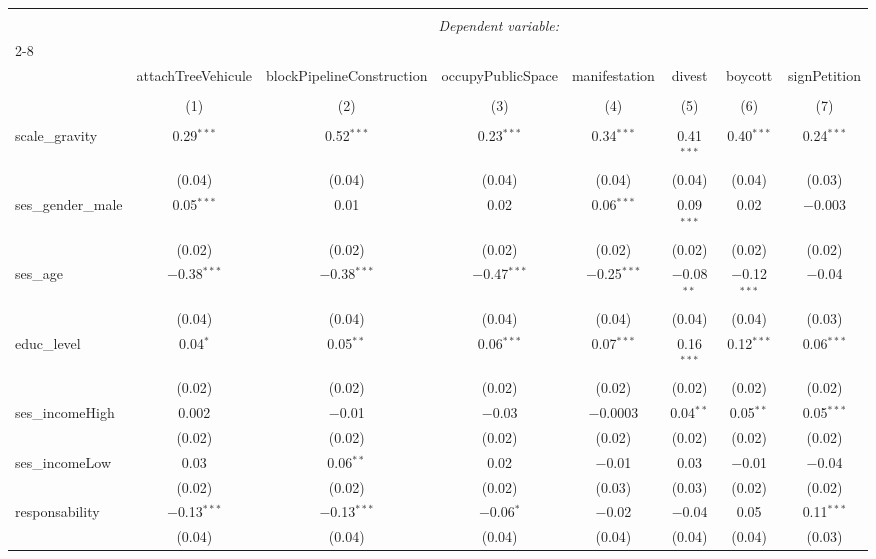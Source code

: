 \documentclass[
]{article}
\begin{document}
\begin{sidewaystable}[!htbp] \centering 
  \caption{Sans interaction 2} 
  \label{} 
\begin{tabular}{@{\extracolsep{1pt}}lccccccc} 
\\[-1.8ex]\hline 
\hline \\[-1.8ex] 
 & \multicolumn{7}{c}{\textit{Dependent variable:}} \\ 
\cline{2-8} 
\\[-1.8ex] & attachTreeVehicule & blockPipelineConstruction & occupyPublicSpace & manifestation & divest & boycott & signPetition \\ 
\\[-1.8ex] & (1) & (2) & (3) & (4) & (5) & (6) & (7)\\ 
\hline \\[-1.8ex] 
 scale\_gravity & 0.29$^{***}$ & 0.52$^{***}$ & 0.23$^{***}$ & 0.34$^{***}$ & 0.41$^{***}$ & 0.40$^{***}$ & 0.24$^{***}$ \\ 
  & (0.04) & (0.04) & (0.04) & (0.04) & (0.04) & (0.04) & (0.03) \\ 
  ses\_gender\_male & 0.05$^{***}$ & 0.01 & 0.02 & 0.06$^{***}$ & 0.09$^{***}$ & 0.02 & $-$0.003 \\ 
  & (0.02) & (0.02) & (0.02) & (0.02) & (0.02) & (0.02) & (0.02) \\ 
  ses\_age & $-$0.38$^{***}$ & $-$0.38$^{***}$ & $-$0.47$^{***}$ & $-$0.25$^{***}$ & $-$0.08$^{**}$ & $-$0.12$^{***}$ & $-$0.04 \\ 
  & (0.04) & (0.04) & (0.04) & (0.04) & (0.04) & (0.04) & (0.03) \\ 
  educ\_level & 0.04$^{*}$ & 0.05$^{**}$ & 0.06$^{***}$ & 0.07$^{***}$ & 0.16$^{***}$ & 0.12$^{***}$ & 0.06$^{***}$ \\ 
  & (0.02) & (0.02) & (0.02) & (0.02) & (0.02) & (0.02) & (0.02) \\ 
  ses\_incomeHigh & 0.002 & $-$0.01 & $-$0.03 & $-$0.0003 & 0.04$^{**}$ & 0.05$^{**}$ & 0.05$^{***}$ \\ 
  & (0.02) & (0.02) & (0.02) & (0.02) & (0.02) & (0.02) & (0.02) \\ 
  ses\_incomeLow & 0.03 & 0.06$^{**}$ & 0.02 & $-$0.01 & 0.03 & $-$0.01 & $-$0.04 \\ 
  & (0.02) & (0.02) & (0.02) & (0.03) & (0.03) & (0.02) & (0.02) \\ 
  responsability & $-$0.13$^{***}$ & $-$0.13$^{***}$ & $-$0.06$^{*}$ & $-$0.02 & $-$0.04 & 0.05 & 0.11$^{***}$ \\ 
  & (0.04) & (0.04) & (0.04) & (0.04) & (0.04) & (0.04) & (0.03) \\ 

\end{tabular}
\end{sidewaystable}
\end{document}
